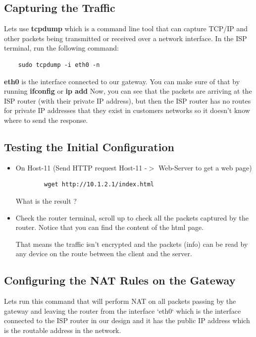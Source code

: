 \subsection{Capturing the Traffic}
Lets use \textbf{tcpdump} which is a command line tool that can capture TCP/IP and other packets being transmitted or received over a network interface.
\newline
\newline
In the ISP terminal, run the following command:
\begin{verbatim}
    sudo tcpdump -i eth0 -n
\end{verbatim}

\textbf{eth0} is the interface connected to our gateway. You can make sure of that by running \textbf{ifconfig} or \textbf{ip add}
\newline
\newline
Now, you can see that the packets are arriving at the ISP router (with their private IP address), but then the ISP router has no routes for private IP addresses that they exist in customers networks so it doesn't know where to send the response.

\subsection{Testing the Initial Configuration}\label{Testing the Initial Configuration}
\begin{itemize}
	\item On Host-11 (Send HTTP request Host-11 -$>$ Web-Server to get a web page)
	\begin{verbatim}
	    wget http://10.1.2.1/index.html
	\end{verbatim}

	What is the result ?

	\item Check the router terminal, scroll up to check all the packets captured by the router. Notice that you can find the content of the html page.

		That means the traffic isn't encrypted and the packets (info) can be read by any device on the route between the client and the server.
\end{itemize}
\subsection{Configuring the NAT Rules on the Gateway}
Lets run this command that will perform NAT on all packets passing by the gateway and leaving the router from the interface `eth0` which is the interface connected to the ISP router in our design and it has the public IP address which is the routable address in the network.

